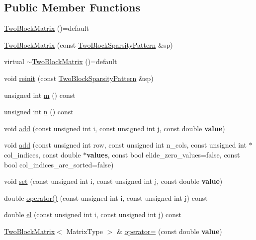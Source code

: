 \subsection*{Public Member Functions}
\begin{DoxyCompactItemize}
\item 
\hyperlink{class_two_block_matrix_aa74bb5722415e61241b5f38c9df29d39}{Two\+Block\+Matrix} ()=default
\item 
\hyperlink{class_two_block_matrix_a861cdc13c0fc6a65ec7d99e4d2349a92}{Two\+Block\+Matrix} (const \hyperlink{class_two_block_sparsity_pattern}{Two\+Block\+Sparsity\+Pattern} \&sp)
\item 
virtual \hyperlink{class_two_block_matrix_a0674b188ebc7bde3ee8f5eb9a94d6265}{$\sim$\+Two\+Block\+Matrix} ()=default
\item 
void \hyperlink{class_two_block_matrix_a5eaa76e9909c600aaa256aa77b577391}{reinit} (const \hyperlink{class_two_block_sparsity_pattern}{Two\+Block\+Sparsity\+Pattern} \&sp)
\item 
unsigned int \hyperlink{class_two_block_matrix_ab15732600f7e6917f961dce5e24b61a6}{m} () const 
\item 
unsigned int \hyperlink{class_two_block_matrix_a7675abf4c2532f48eb3b6bf153755a26}{n} () const 
\item 
void \hyperlink{class_two_block_matrix_a9b5d922689d1f60cbc59d2e424df2dc4}{add} (const unsigned int i, const unsigned int j, const double {\bf value})
\item 
void \hyperlink{class_two_block_matrix_a7373229281e1c3712681c1ac742dffb7}{add} (const unsigned int row, const unsigned int n\+\_\+cols, const unsigned int $\ast$col\+\_\+indices, const double $\ast${\bf values}, const bool elide\+\_\+zero\+\_\+values=false, const bool col\+\_\+indices\+\_\+are\+\_\+sorted=false)
\item 
void \hyperlink{class_two_block_matrix_a5457fd3b6228bed7a731bab2569a17a0}{set} (const unsigned int i, const unsigned int j, const double {\bf value})
\item 
double \hyperlink{class_two_block_matrix_a618495b0ad4cef72d95db7a1f380c20f}{operator()} (const unsigned int i, const unsigned int j) const 
\item 
double \hyperlink{class_two_block_matrix_a67a13d33b3110985bfc604969fc454c9}{el} (const unsigned int i, const unsigned int j) const 
\item 
\hyperlink{class_two_block_matrix}{Two\+Block\+Matrix}$<$ Matrix\+Type $>$ \& \hyperlink{class_two_block_matrix_ac008679a935fb6577931058ac0a6be36}{operator=} (const double {\bf value})

\end{DoxyCompactItemize}
